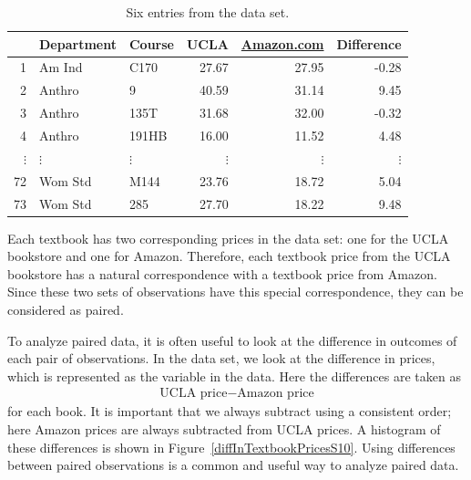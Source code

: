 \begin{table}[H]
\centering
\begin{tabular}{rllrrr}
  \hline
 & Department & Course & UCLA & \href{http://www.amazon.com}{Amazon.com} & Difference \\ 
  \hline
1 & Am Ind &  C170 & 27.67 & 27.95 & -0.28 \\ 
  2 & Anthro & 9 & 40.59 & 31.14 & 9.45 \\ 
  3 & Anthro & 135T & 31.68 & 32.00 & -0.32 \\ 
  4 & Anthro & 191HB & 16.00 & 11.52 & 4.48 \\ 
$\vdots$ & $\vdots$ & $\vdots$ & $\vdots$ & $\vdots$ & $\vdots$ \\
  72 & Wom Std & M144 & 23.76 & 18.72 & 5.04 \\ 
  73 & Wom Std & 285 & 27.70 & 18.22 & 9.48 \\ 
   \hline
\end{tabular}
\captionsetup{width=0.6\textwidth}
\caption{Six entries from the  data set.}
\label{textbooksDF}
\end{table}


Each textbook has two corresponding prices in the data set: one for the UCLA bookstore and one for Amazon. Therefore, each textbook price from the UCLA bookstore has a natural correspondence with a textbook price from Amazon. 
Since these two sets of observations have this special correspondence, they can be considered as paired.

To analyze paired data, it is often useful to look at the difference in outcomes of each pair of observations. In the  data set, we look at the difference in prices, which is represented as the  variable in the  data. Here the differences are taken as
\begin{eqnarray*}
\text{UCLA price} - \text{Amazon price}
\end{eqnarray*}
for each book. It is important that we always subtract using a consistent order; here Amazon prices are always subtracted from UCLA prices. A histogram of these differences is shown in Figure~\ref{diffInTextbookPricesS10}. Using differences between paired observations is a common and useful way to analyze paired data.

